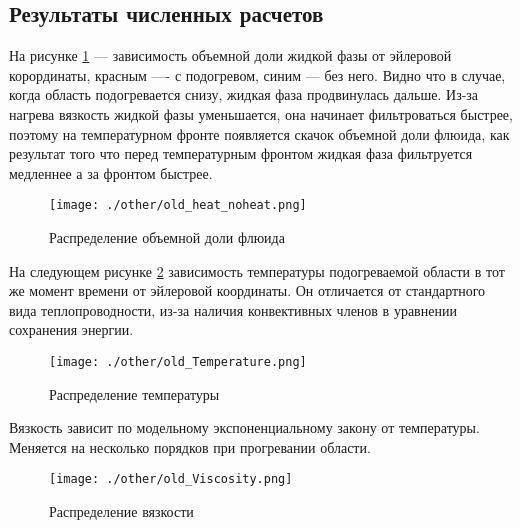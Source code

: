 \documentclass[12pt,a4paper]{article}
\begin{document}
\subsection{Результаты численных расчетов}
На рисунке \ref{end_picture}  --- зависимость объемной доли жидкой фазы от эйлеровой корординаты, красным  ---- с подогревом, синим --- без него. Видно что в случае, когда область подогревается снизу, жидкая фаза продвинулась дальше. Из-за нагрева вязкость жидкой фазы уменьшается, она начинает фильтроваться быстрее, поэтому на температурном фронте появляется скачок объемной доли флюида, как результат того что перед температурным фронтом жидкая фаза фильтруется медленнее а за фронтом быстрее. 

\begin{figure}[ht!]
\begin{center}
\texttt{[image: ./other/old\_heat\_noheat.png]}
\caption{Распределение объемной доли флюида}
\label{end_picture}
\end{center}
\end{figure}

На следующем рисунке \ref{end_pict_2} зависимость температуры подогреваемой области в тот же момент времени от эйлеровой координаты. Он отличается от стандартного вида теплопроводности, из-за наличия конвективных членов в уравнении сохранения энергии.
\newpage
\begin{figure}[ht!]
\begin{center}
\texttt{[image: ./other/old\_Temperature.png]}
\caption{Распределение температуры}
\label{end_pict_2}
\end{center}
\end{figure}

Вязкость зависит по модельному экспоненциальному закону от температуры. Меняется на несколько порядков при прогревании области.

\begin{figure}[ht!]
\begin{center}
\texttt{[image: ./other/old\_Viscosity.png]}
\caption{Распределение вязкости}
\end{center}
\end{figure}
\newpage
\end{document}
